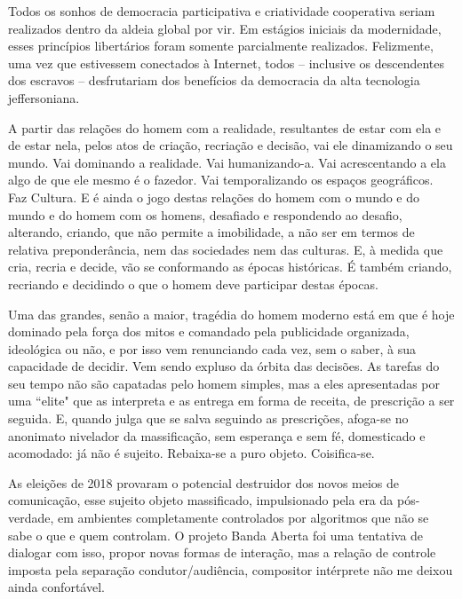 \begin{citacao}
Todos os sonhos de democracia participativa e criatividade cooperativa seriam realizados dentro da aldeia global por vir. Em estágios iniciais da modernidade, esses princípios libertários foram somente parcialmente realizados. Felizmente, uma vez que estivessem conectados à Internet, todos – inclusive os descendentes dos escravos – desfrutariam dos benefícios da democracia da alta tecnologia jeffersoniana.
\end{citacao}\cite[365]{Barbrook2009}
  
\begin{citacao}
A partir das relações do homem com a realidade, resultantes de estar com ela e de estar nela, pelos atos de criação, recriação e decisão, vai ele dinamizando o seu mundo. Vai dominando a realidade. Vai humanizando-a. Vai acrescentando a ela algo de que ele mesmo é o fazedor. Vai temporalizando os espaços geográficos. Faz Cultura. E é ainda o jogo destas relações do homem com o mundo e do mundo e do homem com os homens, desafiado e respondendo ao desafio, alterando, criando, que não permite a imobilidade, a não ser em termos de relativa preponderância, nem das sociedades nem das culturas. E, à medida que cria, recria e decide, vão se conformando as épocas históricas. É também criando, recriando e decidindo o que o homem deve participar destas épocas. \cite[60]{Freire2015}
\end{citacao} 

\begin{citacao}
Uma das grandes, senão a maior, tragédia do homem moderno está em que é hoje dominado pela força dos mitos e comandado pela publicidade organizada, ideológica ou não, e por isso vem renunciando cada vez, sem o saber, à sua capacidade de decidir. Vem sendo expluso da órbita das decisões. As tarefas do seu tempo não são capatadas pelo homem simples, mas a eles apresentadas por uma ``elite" que as interpreta e as entrega em forma de receita, de prescrição a ser seguida. E, quando julga que se salva seguindo as prescrições, afoga-se no anonimato nivelador da massificação, sem esperança e sem fé, domesticado e acomodado: já não é sujeito. Rebaixa-se a puro objeto. Coisifica-se. \cite[60]{Freire2015}
\end{citacao} 

As eleições de 2018 provaram o potencial destruidor dos novos meios de comunicação, esse sujeito objeto massificado, impulsionado pela era da pós-verdade, em ambientes completamente controlados por algoritmos que não se sabe o que e quem controlam. O projeto Banda Aberta foi uma tentativa de dialogar com isso, propor novas formas de interação, mas a relação de controle imposta pela separação condutor/audiência, compositor intérprete não me deixou ainda confortável. 

